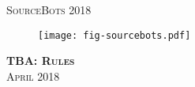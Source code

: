 \documentclass[twoside,12pt,a4paper,titlepage]{article}
\title{\gamename}
\author{\org}
\date{\timeline}
\newcommand{\gamename}{TBA\xspace}
\newcommand{\timeline}{April 2018\xspace}
\begin{document}
\begin{titlepage}
\begin{center}
\textsc{\large SourceBots 2018}\\[3.5cm]
\begin{figure}
    \centering
    \texttt{[image: fig-sourcebots.pdf]}
\end{figure}
\textsc{\huge \textbf{\gamename{}: Rules}}\\[1cm]
\textsc{\large \timeline}\\[3cm]
\end{center}
\end{titlepage}


\clearpage

\clearpage

\end{document}
